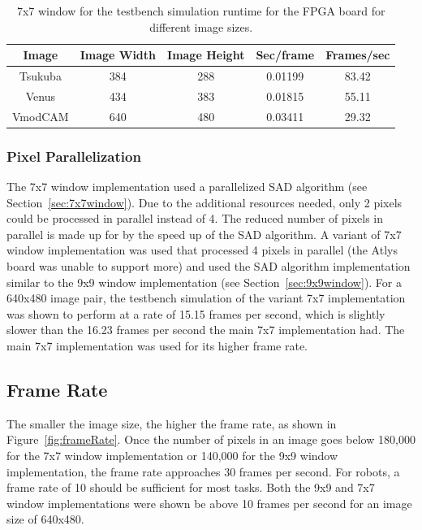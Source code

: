 \begin{table}
	\begin{center}
		\begin{tabular}{|c|c|c|c|c|}
			\hline
				\rowstyle{\bfseries} Image & 
				\rowstyle{\bfseries} Image Width & 
				\rowstyle{\bfseries} Image Height & 
				\rowstyle{\bfseries} Sec/frame & 
				\rowstyle{\bfseries} Frames/sec
			\\ \hline 
			Tsukuba & 384 & 288 & 0.01199 & 83.42
			\\ \hline 
			Venus & 434 & 383 & 0.01815 & 55.11
			\\ \hline 
			VmodCAM & 640 & 480 & 0.03411 & 29.32
			\\ \hline 
		\end{tabular}	
		\captionfonts
		\caption{7x7 window for the testbench simulation runtime for the FPGA board for different image sizes.}
		\label{table:tb_7x7}
	\end{center}
\end{table}

\subsubsection{Pixel Parallelization}
\label{sec:7x7pixelParallel4}

The 7x7 window implementation used a parallelized SAD algorithm (see Section~\ref{sec:7x7window}). Due to the additional resources needed, only 2 pixels could be processed in parallel instead of 4. The reduced number of pixels in parallel is made up for by the speed up of the SAD algorithm. A variant of 7x7 window implementation was used that processed 4 pixels in parallel (the Atlys board was unable to support more) and used the SAD algorithm implementation similar to the 9x9 window implementation (see Section~\ref{sec:9x9window}). For a 640x480 image pair, the testbench simulation of the variant 7x7 implementation was shown to perform at a rate of 15.15 frames per second, which is slightly slower than the 16.23 frames per second the main 7x7 implementation had. The main 7x7 implementation was used for its higher frame rate.

\subsection{Frame Rate}
\label{sec:frameRate}

The smaller the image size, the higher the frame rate, as shown in Figure~\ref{fig:frameRate}. Once the number of pixels in an image goes below 180,000 for the 7x7 window implementation or 140,000 for the 9x9 window implementation, the frame rate approaches 30 frames per second. For robots, a frame rate of 10 should be sufficient for most tasks. Both the 9x9 and 7x7 window implementations were shown be above 10 frames per second for an image size of 640x480.

